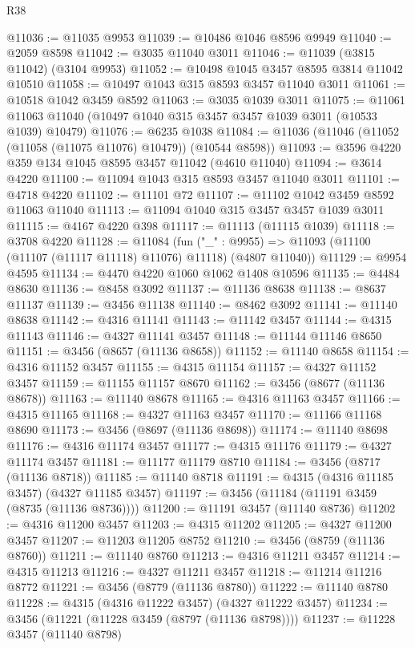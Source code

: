 \begin{lexlean}{R38}
\begin{coremodule}
@11036 := @11035 @9953
@11039 := @10486 @1046 @8596 @9949
@11040 := @2059 @8598
@11042 := @3035 @11040 @3011
@11046 := @11039 (@3815 @11042) (@3104 @9953)
@11052 := @10498 @1045 @3457 @8595 @3814 @11042 @10510
@11058 := @10497 @1043 @315 @8593 @3457 @11040 @3011
@11061 := @10518 @1042 @3459 @8592
@11063 := @3035 @1039 @3011
@11075 := @11061 @11063 @11040 (@10497 @1040 @315 @3457 @3457 @1039 @3011 (@10533 @1039) @10479)
@11076 := @6235 @1038
@11084 := @11036 (@11046 (@11052 (@11058 (@11075 @11076) @10479)) (@10544 @8598))
@11093 := @3596 @4220 @359 @134 @1045 @8595 @3457 @11042 (@4610 @11040)
@11094 := @3614 @4220
@11100 := @11094 @1043 @315 @8593 @3457 @11040 @3011
@11101 := @4718 @4220
@11102 := @11101 @72
@11107 := @11102 @1042 @3459 @8592 @11063 @11040
@11113 := @11094 @1040 @315 @3457 @3457 @1039 @3011
@11115 := @4167 @4220 @398
@11117 := @11113 (@11115 @1039)
@11118 := @3708 @4220
@11128 := @11084
    (fun ("_" : @9955) => @11093 (@11100 (@11107 (@11117 @11118) @11076) @11118) (@4807 @11040))
@11129 := @9954 @4595
@11134 := @4470 @4220 @1060 @1062 @1408 @10596
@11135 := @4484 @8630
@11136 := @8458 @3092
@11137 := @11136 @8638
@11138 := @8637 @11137
@11139 := @3456 @11138
@11140 := @8462 @3092
@11141 := @11140 @8638
@11142 := @4316 @11141
@11143 := @11142 @3457
@11144 := @4315 @11143
@11146 := @4327 @11141 @3457
@11148 := @11144 @11146 @8650
@11151 := @3456 (@8657 (@11136 @8658))
@11152 := @11140 @8658
@11154 := @4316 @11152 @3457
@11155 := @4315 @11154
@11157 := @4327 @11152 @3457
@11159 := @11155 @11157 @8670
@11162 := @3456 (@8677 (@11136 @8678))
@11163 := @11140 @8678
@11165 := @4316 @11163 @3457
@11166 := @4315 @11165
@11168 := @4327 @11163 @3457
@11170 := @11166 @11168 @8690
@11173 := @3456 (@8697 (@11136 @8698))
@11174 := @11140 @8698
@11176 := @4316 @11174 @3457
@11177 := @4315 @11176
@11179 := @4327 @11174 @3457
@11181 := @11177 @11179 @8710
@11184 := @3456 (@8717 (@11136 @8718))
@11185 := @11140 @8718
@11191 := @4315 (@4316 @11185 @3457) (@4327 @11185 @3457)
@11197 := @3456 (@11184 (@11191 @3459 (@8735 (@11136 @8736))))
@11200 := @11191 @3457 (@11140 @8736)
@11202 := @4316 @11200 @3457
@11203 := @4315 @11202
@11205 := @4327 @11200 @3457
@11207 := @11203 @11205 @8752
@11210 := @3456 (@8759 (@11136 @8760))
@11211 := @11140 @8760
@11213 := @4316 @11211 @3457
@11214 := @4315 @11213
@11216 := @4327 @11211 @3457
@11218 := @11214 @11216 @8772
@11221 := @3456 (@8779 (@11136 @8780))
@11222 := @11140 @8780
@11228 := @4315 (@4316 @11222 @3457) (@4327 @11222 @3457)
@11234 := @3456 (@11221 (@11228 @3459 (@8797 (@11136 @8798))))
@11237 := @11228 @3457 (@11140 @8798)

\end{coremodule}
\end{lexlean}
